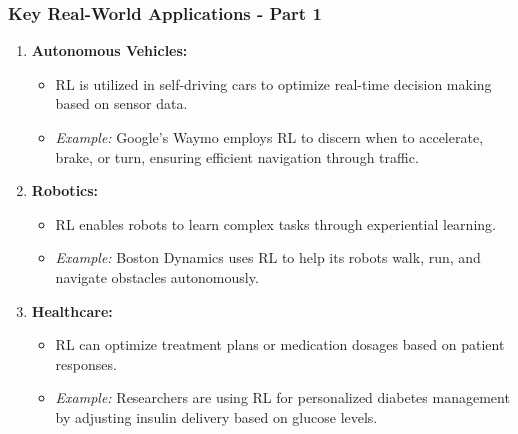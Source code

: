 \documentclass[aspectratio=169]{beamer}
\begin{document}
\begin{frame}[fragile]
    \frametitle{Key Real-World Applications - Part 1}
    
    \begin{enumerate}
        \item \textbf{Autonomous Vehicles:}
        \begin{itemize}
            \item RL is utilized in self-driving cars to optimize real-time decision making based on sensor data.
            \item \textit{Example:} Google’s Waymo employs RL to discern when to accelerate, brake, or turn, ensuring efficient navigation through traffic.
        \end{itemize}
        
        \item \textbf{Robotics:}
        \begin{itemize}
            \item RL enables robots to learn complex tasks through experiential learning.
            \item \textit{Example:} Boston Dynamics uses RL to help its robots walk, run, and navigate obstacles autonomously.
        \end{itemize}
        
        \item \textbf{Healthcare:}
        \begin{itemize}
            \item RL can optimize treatment plans or medication dosages based on patient responses.
            \item \textit{Example:} Researchers are using RL for personalized diabetes management by adjusting insulin delivery based on glucose levels.
        \end{itemize}
    \end{enumerate}
\end{frame}
\end{document}
